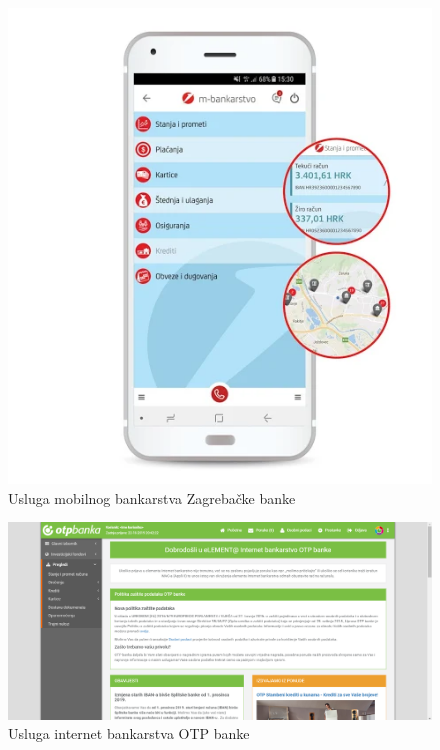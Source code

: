 		\begin{figure}[H]
			\includegraphics[scale=1]{slike/mzaba.PNG}
			\centering
			\caption{Usluga mobilnog bankarstva Zagrebačke banke}
			\label{fig:mzaba}
		\end{figure}
	
		\begin{figure}[H]
			\includegraphics[scale=0.4]{slike/otp.PNG}
			\centering
			\caption{Usluga internet bankarstva OTP banke}
			\label{fig:otp}
		\end{figure}
	
